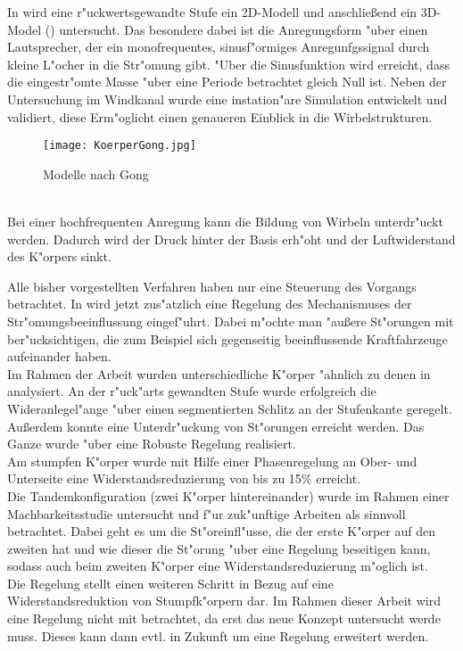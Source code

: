 In \cite{Gong.2015} wird eine r"uckwertsgewandte Stufe ein 2D-Modell und anschlie\ss{}end ein 3D-Model () untersucht. Das besondere dabei ist die Anregungsform "uber einen Lautsprecher, der ein monofrequentes, sinusf"ormiges Anregunfgssignal durch kleine L"ocher in die Str"omung gibt. "Uber die Sinusfunktion wird erreicht, dass die eingestr"omte Masse "uber eine Periode betrachtet gleich Null ist. Neben der Untersuchung im Windkanal wurde eine instation"are Simulation entwickelt und validiert, diese Erm"oglicht einen genaueren Einblick in die Wirbelstrukturen.
\begin{figure}[h]
	\centering
	\texttt{[image: KoerperGong.jpg]}
	\caption{Modelle nach Gong \cite{Gong.2015}}
	\label{fig:Gong}
\end{figure}\\
Bei einer hochfrequenten Anregung kann die Bildung von Wirbeln unterdr"uckt werden. Dadurch wird der Druck hinter der Basis erh"oht und der Luftwiderstand des K"orpers sinkt.

Alle bisher vorgestellten Verfahren haben nur eine Steuerung des Vorgangs betrachtet. In \cite{Henning.2008} wird jetzt zus"atzlich eine Regelung des Mechanismuses der Str"omungsbeeinflussung eingef"uhrt. Dabei m"ochte man "au\ss{}ere St"orungen mit ber"ucksichtigen, die zum Beispiel sich gegenseitig beeinflussende Kraftfahrzeuge aufeinander haben.\\
Im Rahmen der Arbeit \cite{Henning.2008} wurden unterschiedliche K"orper "ahnlich zu denen in  analysiert.
An der r"uck"arts gewandten Stufe wurde erfolgreich die Wideranlegel"ange "uber einen segmentierten Schlitz an der Stufenkante geregelt. Au\ss{}erdem konnte eine Unterdr"uckung von St"orungen erreicht werden. Das Ganze wurde "uber eine Robuste Regelung realisiert.\\
Am stumpfen K"orper wurde mit Hilfe einer Phasenregelung an Ober- und Unterseite eine Widerstandsreduzierung von bis zu 15\% erreicht.\\
Die Tandemkonfiguration (zwei K"orper hintereinander) wurde im Rahmen einer Machbarkeitsstudie \cite{Henning.2008} untersucht und f"ur zuk"unftige Arbeiten als sinnvoll betrachtet. Dabei geht es um die St"oreinfl"usse, die der erste K"orper auf den zweiten hat und wie dieser die St"orung "uber eine Regelung beseitigen kann, sodass auch beim zweiten K"orper eine Widerstandsreduzierung m"oglich ist.\\
Die Regelung stellt einen weiteren Schritt in Bezug auf eine Widerstandsreduktion von Stumpfk"orpern dar. Im Rahmen dieser Arbeit wird eine Regelung nicht mit betrachtet, da erst das neue Konzept untersucht werde muss. Dieses kann dann evtl. in Zukunft um eine Regelung erweitert werden.
